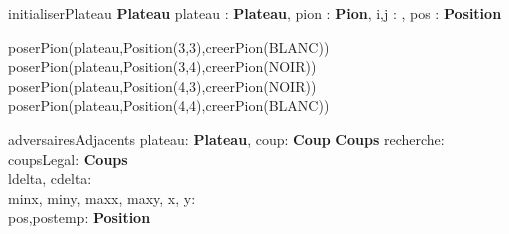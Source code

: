 \begin{algorithme}
  \small
  \fonction
      {initialiserPlateau}
      {}
      {\textbf{Plateau}}
      {plateau : \textbf{Plateau}, pion : \textbf{Pion}, i,j : \naturel, pos : \textbf{Position}}
      { 

        poserPion(plateau,Position(3,3),creerPion(BLANC))\\
        poserPion(plateau,Position(3,4),creerPion(NOIR))\\
        poserPion(plateau,Position(4,3),creerPion(NOIR))\\
        poserPion(plateau,Position(4,4),creerPion(BLANC))\\
      }
\end{algorithme}

\vspace{5mm}

\begin{algorithme}
  \small
  \fonction
      {adversairesAdjacents}
      {plateau: \textbf{Plateau}, coup: \textbf{Coup}}
      {\textbf{Coups}}
      {
        recherche: \booleen\\
        coupsLegal: \textbf{Coups}\\
        ldelta, cdelta: \entier\\
        minx, miny, maxx, maxy, x, y: \entier\\
        pos,postemp: \textbf{Position}\\
      }
      {
                {
                          {
                                    {
                                              {
                                              }
                                    }
                          }
                }
      }
\end{algorithme}

